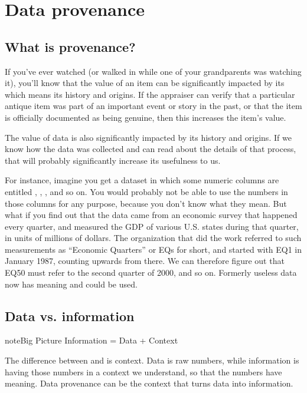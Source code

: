\documentclass[letterpaper,10pt,english]{sphinxmanual}
\begin{document}
\section{Data provenance}
\label{\detokenize{chapter-13-etl:data-provenance}}

\subsection{What is provenance?}
\label{\detokenize{chapter-13-etl:what-is-provenance}}
If you’ve ever watched  (or walked in while one of your grandparents was watching it), you’ll know that the value of an item can be significantly impacted by its  which means its history and origins.  If the appraiser can verify that a particular antique item was part of an important event or story in the past, or that the item is officially documented as being genuine, then this increases the item’s value.

The value of data is also significantly impacted by its history and origins.  If we know how the data was collected and can read about the details of that process, that will probably significantly increase its usefulness to us.

For instance, imagine you get a dataset in which some numeric columns are entitled , , , and so on.  You would probably not be able to use the numbers in those columns for any purpose, because you don’t know what they mean.  But what if you find out that the data came from an economic survey that happened every quarter, and measured the GDP of various U.S. states during that quarter, in units of millions of dollars.  The organization that did the work referred to such measurements as “Economic Quarters” or EQs for short, and started with EQ1 in January 1987, counting upwards from there.  We can therefore figure out that EQ50 must refer to the second quarter of 2000, and so on.  Formerly useless data now has meaning and could be used.


\subsection{Data vs. information}
\label{\detokenize{chapter-13-etl:data-vs-information}}
\begin{sphinxadmonition}{note}{Big Picture \sphinxhyphen{} Information = Data + Context}

The difference between  and  is context.  Data is raw numbers, while information is having those numbers in a context we understand, so that the numbers have meaning.  Data provenance can be the context that turns data into information.
\end{sphinxadmonition}
\end{document}
